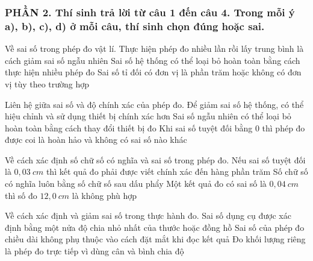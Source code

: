 \subsubsection*{PHẦN 2. Thí sinh trả lời từ câu 1 đến câu 4. Trong mỗi ý a), b), c), d) ở mỗi câu, thí sinh chọn đúng hoặc sai.}
\setcounter{ex}{0}
\begin{ex}
Về sai số trong phép đo vật lí.
{\True Thực hiện phép đo nhiều lần rồi lấy trung bình là cách giảm sai số ngẫu nhiên}
{Sai số hệ thống có thể loại bỏ hoàn toàn bằng cách thực hiện nhiều phép đo}
{Sai số tỉ đối có đơn vị là phần trăm hoặc không có đơn vị tùy theo trường hợp}
\loigiai{
\begin{itemchoice}
\itemch
\itemch
\itemch
\itemch
\end{itemchoice}
}
\end{ex}
\begin{ex}
Liên hệ giữa sai số và độ chính xác của phép đo.
{\True Để giảm sai số hệ thống, có thể hiệu chỉnh và sử dụng thiết bị chính xác hơn}
{Sai số ngẫu nhiên có thể loại bỏ hoàn toàn bằng cách thay đổi thiết bị đo}
{Khi sai số tuyệt đối bằng 0 thì phép đo được coi là hoàn hảo và không có sai số nào khác}
\loigiai{
\begin{itemchoice}
\itemch
\itemch
\itemch
\itemch
\end{itemchoice}
}
\end{ex}
\begin{ex}
Về cách xác định số chữ số có nghĩa và sai số trong phép đo.
{\True Nếu sai số tuyệt đối là $0,03\ cm$ thì kết quả đo phải được viết chính xác đến hàng phần trăm}
{Số chữ số có nghĩa luôn bằng số chữ số sau dấu phẩy}
{Một kết quả đo có sai số là $0,04\ cm$ thì số đo $12,0\ cm$ là không phù hợp}
\loigiai{
\begin{itemchoice}
\itemch
\itemch
\itemch
\itemch
\end{itemchoice}
}
\end{ex}
\begin{ex}
Về cách xác định và giảm sai số trong thực hành đo.
{\True Sai số dụng cụ được xác định bằng một nửa độ chia nhỏ nhất của thước hoặc đồng hồ}
{Sai số của phép đo chiều dài không phụ thuộc vào cách đặt mắt khi đọc kết quả}
{Đo khối lượng riêng là phép đo trực tiếp vì dùng cân và bình chia độ}
\loigiai{
\begin{itemchoice}
\itemch
\itemch
\itemch
\itemch
\end{itemchoice}
}
\end{ex}
